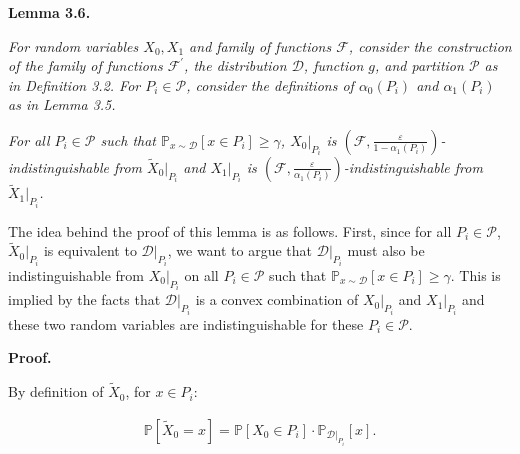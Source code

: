 \documentclass[10pt,a4paper]{article}
\begin{document}


\par\medskip\noindent\textbf{
\textbf{Lemma 3.6}\textbf{.}
}\par



\emph{For random variables $X_{0},X_{1}$ and family of functions $\mathcal{F}$, consider the construction of the family of functions $\mathcal{F}^{\prime}$, the distribution $\mathcal{D}$, function $g$, and partition $\mathcal{P}$ as in Definition 3.2. For $P_{i}\in\mathcal{P}$, consider the definitions of $\alpha_{0}(P_{i})$ and $\alpha_{1}(P_{i})$ as in Lemma 3.5.}\par




\emph{For all $P_{i}\in\mathcal{P}$ such that $\mathbb{P}_{x\sim\mathcal{D}}[x\in P_{i}]\geq\gamma$, $X_{0}|_{P_{i}}$ is $(\mathcal{F},\frac{\varepsilon}{1-\alpha_{1}(P_{i})})$-indistinguishable from $\widetilde{X}_{0}|_{P_{i}}$ and $X_{1}|_{P_{i}}$ is $(\mathcal{F},\frac{\varepsilon}{\alpha_{1}(P_{i})})$-indistinguishable from $\widetilde{X}_{1}|_{P_{i}}$.}\par






The idea behind the proof of this lemma is as follows. First, since for all $P_{i}\in\mathcal{P}$, $\widetilde{X}_{0}|_{P_{i}}$ is equivalent to $\mathcal{D}|_{P_{i}}$, we want to argue that $\mathcal{D}|_{P_{i}}$ must also be indistinguishable from $X_{0}|_{P_{i}}$ on all $P_{i}\in\mathcal{P}$ such that $\mathbb{P}_{x\sim\mathcal{D}}[x\in P_{i}]\geq\gamma$. This is implied by the facts that $\mathcal{D}|_{P_{i}}$ is a convex combination of $X_{0}|_{P_{i}}$ and $X_{1}|_{P_{i}}$ and these two random variables are indistinguishable for these $P_{i}\in\mathcal{P}$.\par





\par\medskip\noindent\textbf{Proof.}\par




By definition of $\widetilde{X}_{0}$, for $x\in P_{i}$:\par


\[\begin{gathered}
\mathbb{P}[\widetilde{X}_{0}=x]=\mathbb{P}[X_{0}\in P_{i}]\cdot\mathbb{P}_{\mathcal{D}|_{P_{i}}}[x].
\end{gathered}\]
\end{document}

